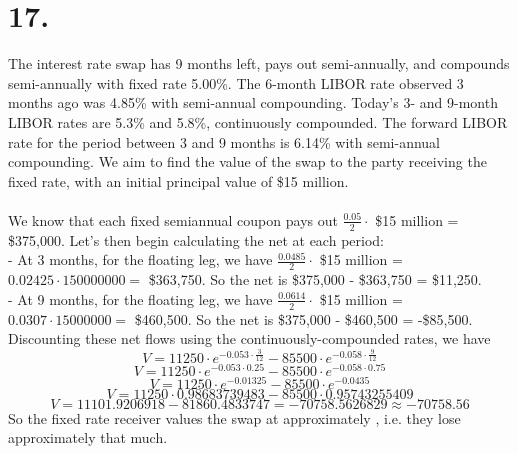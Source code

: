 \documentclass{article}
\begin{document}
{\Large 

\section*{17.}

The interest rate swap has 9 months left, pays out semi-annually, and compounds semi-annually with fixed rate 5.00\%. The 6-month LIBOR rate observed 3 months ago was 4.85\% with semi-annual compounding. Today's 3- and 9-month LIBOR rates are 5.3\% and 5.8\%, continuously compounded. The forward LIBOR rate for the period between 3 and 9 months is 6.14\% with semi-annual compounding. We aim to find the value of the swap to the party receiving the fixed rate, with an initial principal value of \$15 million. \\ \\
We know that each fixed semiannual coupon pays out \(\frac{0.05}{2} \cdot \) \$15 million = \$375,000. Let's then begin calculating the net at each period: \\
- At 3 months, for the floating leg, we have \(\frac{0.0485}{2} \cdot \) \$15 million = \(0.02425 \cdot 150000000 = \) \$363,750. So the net is \$375,000 - \$363,750 = \$11,250. \\
- At 9 months, for the floating leg, we have \(\frac{0.0614}{2} \cdot \) \$15 million = \(0.0307 \cdot 15000000 = \) \$460,500. So the net is \$375,000 - \$460,500 = -\$85,500. \\
Discounting these net flows using the continuously-compounded rates, we have 
\[
  V = 11250 \cdot e^{-0.053 \cdot \frac{3}{12}} - 85500 \cdot e^{-0.058 \cdot \frac{9}{12}}
\]
\[
  V = 11250 \cdot e^{-0.053 \cdot 0.25} - 85500 \cdot e^{-0.058 \cdot 0.75}
\]
\[
  V = 11250 \cdot e^{-0.01325} - 85500 \cdot e^{-0.0435}
\]
\[
  V = 11250 \cdot 0.98683739483 - 85500 \cdot 0.95743255409
\]
\[
  V = 11101.9206918 - 81860.4833747 = -70758.5626829 \approx -70758.56
\]
So the fixed rate receiver values the swap at approximately , i.e. they lose approximately that much. 

}
\end{document}
